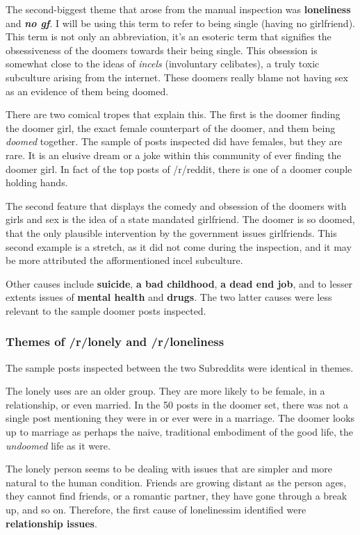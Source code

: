 \documentclass[../report.tex]{subfiles}
\begin{document}
The second-biggest theme that arose from the manual inspection was \textbf{loneliness} and \textbf{\textit{no gf}}. 
I will be using this term to refer to being single (having no girlfriend).
This term is not only an abbreviation, it's an esoteric term that signifies the obsessiveness of the doomers towards their being single.
This obsession is somewhat close to the ideas of \textit{incels} (involuntary celibates), a truly toxic subculture arising from the internet. 
These doomers really blame not having sex as an evidence of them being doomed. 

There are two comical tropes that explain this. 
The first is the doomer finding the doomer girl, the exact female counterpart of the doomer, and them being \textit{doomed} together. 
The sample of posts inspected did have females, but they are rare. 
It is an elusive dream or a joke within this community of ever finding the doomer girl. 
In fact of the top posts of /r/reddit, there is one of a doomer couple holding hands. 

The second feature that displays the comedy and obsession of the doomers with girls and sex is the idea of a state mandated girlfriend. 
The doomer is so doomed, that the only plausible intervention by the government issues girlfriends. 
This second example is a stretch, as it did not come during the inspection, and it may be more attributed the afformentioned incel subculture. 

Other causes include \textbf{suicide}, \textbf{a bad childhood}, \textbf{a dead end job}, and to lesser extents issues of \textbf{mental health} and \textbf{drugs}. The two latter causes were less relevant to the sample doomer posts inspected.

\subsubsection{Themes of /r/lonely and /r/loneliness}
The sample posts inspected between the two Subreddits were identical in themes. 


The lonely uses are an older group.
They are more likely to be female, in a relationship, or even married.
In the 50 posts in the doomer set, there was not a single post mentioning they were in or ever were in a marriage. 
The doomer looks up to marriage as perhaps the naive, traditional embodiment of the good life, the \textit{undoomed} life as it were. 

The lonely person seems to be dealing with issues that are simpler and more natural to the human condition. 
Friends are growing distant as the person ages, they cannot find friends, or a romantic partner, they have gone through a break up, and so on. 
Therefore, the first cause of lonelinessim identified were \textbf{relationship issues}.
\end{document}
